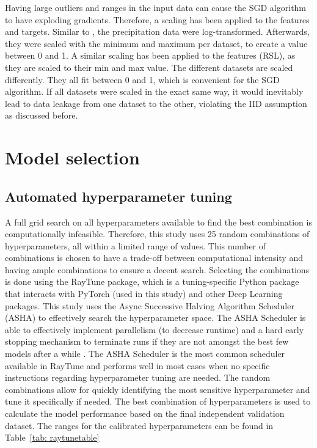\documentclass[twocolumn, 10pt, a4paper]{memoir}
\begin{document}
		Having large outliers and ranges in the input data can cause the SGD algorithm to have exploding gradients. Therefore, a scaling has been applied to the features and targets. Similar to \cite{Kilmartin1972}, the precipitation data were log-transformed. Afterwards, they were scaled with the minimum and maximum per dataset, to create a value between 0 and 1. A similar scaling has been applied to the features (RSL), as they are scaled to their min and max value. 
		The different datasets are scaled differently. They all fit between 0 and 1, which is convenient for the SGD algorithm. If all datasets were scaled in the exact same way, it would inevitably lead to data leakage from one dataset to the other, violating the IID assumption as discussed before. 
		

	\section{Model selection} \label{modelselection}
		\subsection{Automated hyperparameter tuning} \label{RayTune}
		A full grid search on all hyperparameters available to find the best combination is computationally infeasible. Therefore, this study uses 25 random combinations of hyperparameters, all within a limited range of values. This number of combinations is chosen to have a trade-off between computational intensity and having ample combinations to ensure a decent search.
		Selecting the combinations is done using the RayTune package, which is a tuning-specific Python package that interacts with PyTorch (used in this study) and other Deep Learning packages. This study uses the Async Successive Halving Algorithm Scheduler (ASHA) to effectively search the hyperparameter space. The ASHA Scheduler is able to effectively implement parallelism (to decrease runtime) and a hard early stopping mechanism to terminate runs if they are not amongst the best few models after a while \cite{Li2018}. The ASHA Scheduler is the most common scheduler available in RayTune and performs well in most cases when no specific instructions regarding hyperparameter tuning are needed.  
		The random combinations allow for quickly identifying the most sensitive hyperparameter and tune it specifically if needed. The best combination of hyperparameters is used to calculate the model performance based on the final independent validation dataset. The ranges for the calibrated hyperparameters can be found in Table~\ref{tab: raytunetable}
		
\end{document}
